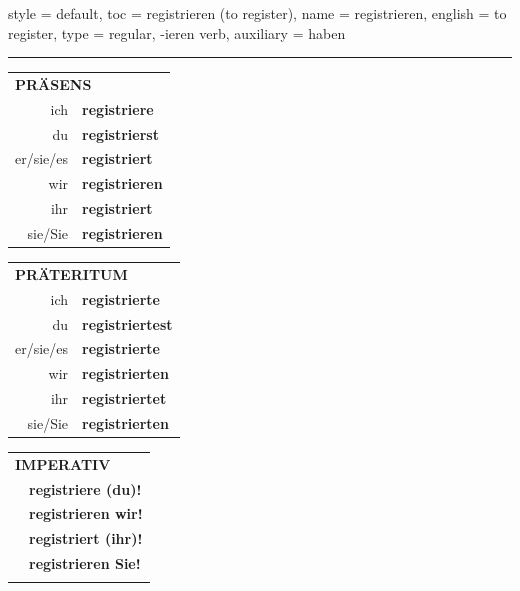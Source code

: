 \begin{verbentry}{
  style = {default},
  toc = {registrieren (to register)},
  name = {registrieren},
  english = {to register},
  type = {regular, -ieren verb},
  auxiliary = {haben}
}
 
    
     \vspace{5pt}

    \hrule
    
    \vspace{5pt}

  \begin{tabular}{rl}
     \multicolumn{2}{l}{\textbf{PRÄSENS} }\\
    ich & \textbf{registriere}\\
    du & \textbf{registrierst}\\
    er/sie/es & \textbf{registriert}\\
    wir & \textbf{registrieren}\\
    ihr & \textbf{registriert}\\
    sie/Sie & \textbf{registrieren}\\
  \end{tabular}
  \hfill
     \begin{tabular}{rl}
    \multicolumn{2}{l}{\textbf{PRÄTERITUM} }\\
    ich & \textbf{registrierte}\\
    du & \textbf{registriertest}\\
    er/sie/es & \textbf{registrierte}\\
    wir & \textbf{registrierten}\\
    ihr & \textbf{registriertet}\\
    sie/Sie & \textbf{registrierten}\\
  \end{tabular}
  \hfill
  \begin{tabular}{rl}
     \multicolumn{2}{l}{\textbf{IMPERATIV} }\\
   & \textbf{registriere (du)!}\\
   & \textbf{registrieren wir!}\\
   & \textbf{registriert (ihr)!}\\
   & \textbf{registrieren Sie!}\\
   & \vspace{10pt}
  \end{tabular}

    \vspace{10pt}


\end{verbentry}
